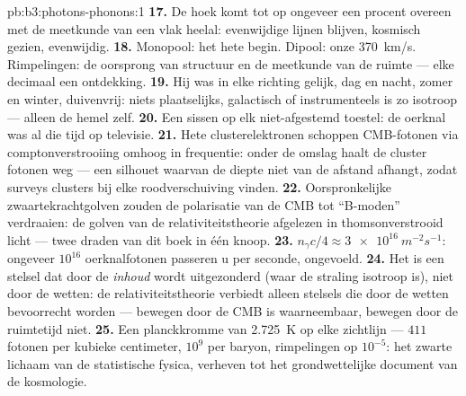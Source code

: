 \begin{solution}{pb:b3:photons-phonons:1}
\textbf{17.} De hoek komt tot op ongeveer een procent overeen met
de meetkunde van een vlak heelal: evenwijdige lijnen blijven,
kosmisch gezien, evenwijdig.
\textbf{18.} Monopool: het hete begin. Dipool: onze
\qty{370}{km/s}. Rimpelingen: de oorsprong van structuur en de
meetkunde van de ruimte --- elke decimaal een ontdekking.
\textbf{19.} Hij was in elke richting gelijk, dag en nacht,
zomer en winter, duivenvrij: niets plaatselijks, galactisch of
instrumenteels is zo isotroop --- alleen de hemel zelf.
\textbf{20.} Een sissen op elk niet-afgestemd toestel: de oerknal
was al die tijd op televisie.
\textbf{21.} Hete clusterelektronen schoppen CMB-fotonen via
compton\-verstrooiing omhoog in frequentie: onder de omslag haalt
de cluster fotonen weg --- een silhouet waarvan de diepte niet van
de afstand afhangt, zodat surveys clusters bij elke
roodverschuiving vinden.
\textbf{22.} Oorspronkelijke zwaartekrachtgolven zouden de
polarisatie van de CMB tot ``B-moden'' verdraaien: de golven van de
relativiteitstheorie afgelezen in thomsonverstrooid licht --- twee
draden van dit boek in één knoop.
\textbf{23.} $n_\gamma c/4 \approx \qty{3e16}{m^{-2}s^{-1}}$:
ongeveer $10^{16}$ oerknalfotonen passeren u per seconde,
ongevoeld.
\textbf{24.} Het is een stelsel dat door de \emph{inhoud} wordt
uitgezonderd (waar de straling isotroop is), niet door de wetten:
de relativiteitstheorie verbiedt alleen stelsels die door de wetten
bevoorrecht worden --- bewegen door de CMB is waarneembaar,
bewegen door de ruimtetijd niet.
\textbf{25.} Een planckkromme van \qty{2.725}{K} op elke zichtlijn
--- $411$ fotonen per kubieke centimeter, $10^9$ per baryon,
rimpelingen op $10^{-5}$: het zwarte lichaam van de statistische
fysica, verheven tot het grondwettelijke document van de kosmologie.
\end{solution}
